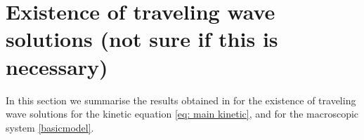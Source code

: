\documentclass[11pt,twoside]{article}
\numberwithin{equation}{section}
\DeclareMathOperator{\sign}{sign}
\theoremstyle{plain}
\theoremstyle{nonumberplain}
\begin{document}

\iffalse
\section{Existence of traveling wave solutions (not sure if this is necessary)}

In this section we summarise the results obtained in \cite{calvez2019chemotactic} for the existence of traveling wave solutions for the kinetic equation \eqref{eq: main kinetic},  and for the macroscopic system \eqref{basicmodel}.
\end{document}
